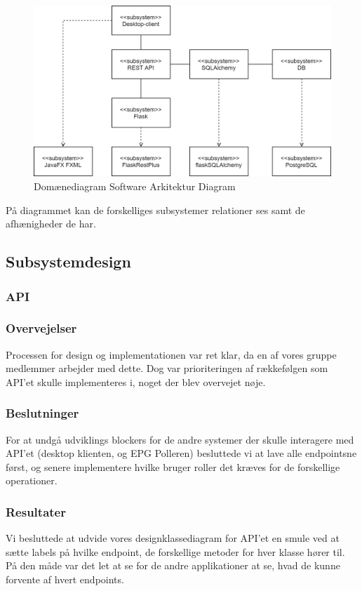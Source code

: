 \begin{figure}[h]
    \centering
    \includegraphics[width=\textwidth]{figures/design/domaindiagram-Software Architecture Diagram.png}
    \caption{Domænediagram Software Arkitektur Diagram}
    \label{fig:domaindiagram-software-diagram}
\end{figure}{}

På diagrammet kan de forskelliges subsystemer relationer ses samt de afhænigheder de har. 

\subsection{Subsystemdesign}
\subsubsection{API}
\subsubsection{Overvejelser}
Processen for design og implementationen var ret klar, da en af vores gruppe medlemmer arbejder med dette. Dog var prioriteringen af rækkefølgen som API'et skulle implementeres i, noget der blev overvejet nøje. 

\subsubsection{Beslutninger}
For at undgå udviklings blockers for de andre systemer der skulle interagere med API'et (desktop klienten, og EPG Polleren) besluttede vi at lave alle endpointsne først, og senere implementere hvilke bruger roller det kræves for de forskellige operationer.

\subsubsection{Resultater}
Vi besluttede at udvide vores designklassediagram for API'et en smule ved at sætte labels på hvilke endpoint, de forskellige metoder for hver klasse hører til. På den måde var det let at se for de andre applikationer at se, hvad de kunne forvente af hvert endpoints.

